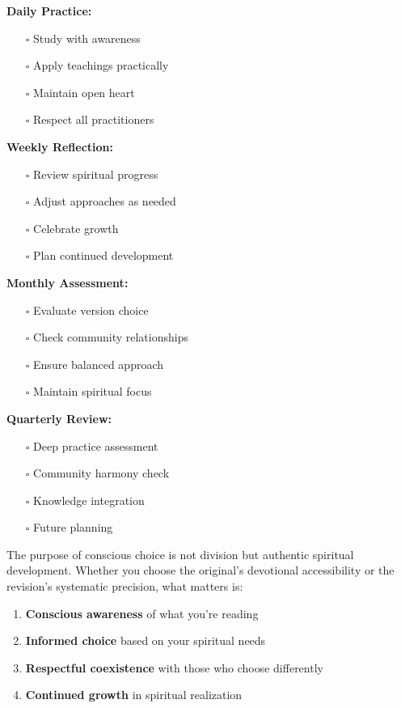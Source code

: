\documentclass[12pt,twoside]{book}
\begin{document}
\textbf{\textbf{Daily Practice:}}
\begin{itemize}
\item[{$\square$}] Study with awareness
\item[{$\square$}] Apply teachings practically
\item[{$\square$}] Maintain open heart
\item[{$\square$}] Respect all practitioners
\end{itemize}

\textbf{\textbf{Weekly Reflection:}}
\begin{itemize}
\item[{$\square$}] Review spiritual progress
\item[{$\square$}] Adjust approaches as needed
\item[{$\square$}] Celebrate growth
\item[{$\square$}] Plan continued development
\end{itemize}

\textbf{\textbf{Monthly Assessment:}}
\begin{itemize}
\item[{$\square$}] Evaluate version choice
\item[{$\square$}] Check community relationships
\item[{$\square$}] Ensure balanced approach
\item[{$\square$}] Maintain spiritual focus
\end{itemize}

\textbf{\textbf{Quarterly Review:}}
\begin{itemize}
\item[{$\square$}] Deep practice assessment
\item[{$\square$}] Community harmony check
\item[{$\square$}] Knowledge integration
\item[{$\square$}] Future planning
\end{itemize}

The purpose of conscious choice is not division but authentic spiritual development. Whether you choose the original's devotional accessibility or the revision's systematic precision, what matters is:

\begin{enumerate}
\item \textbf{\textbf{Conscious awareness}} of what you're reading
\item \textbf{\textbf{Informed choice}} based on your spiritual needs
\item \textbf{\textbf{Respectful coexistence}} with those who choose differently
\item \textbf{\textbf{Continued growth}} in spiritual realization
\end{enumerate}
\end{document}
